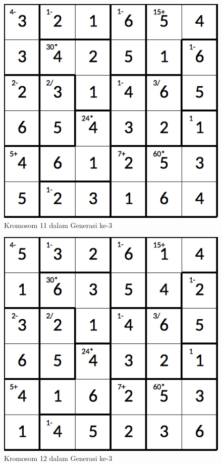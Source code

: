 \begin{figure}
\centering
\captionsetup{justification=centering}
\includegraphics[scale=0.333]{Gambar/hybridgenetic/Generation3Chromosome11}
\caption[Kromosom 11 dalam Generasi ke-3]{Kromosom 11 dalam Generasi ke-3}
\label{fig:analisisg3k11}
\end{figure}

\begin{figure}
\centering
\captionsetup{justification=centering}
\includegraphics[scale=0.333]{Gambar/hybridgenetic/Generation3Chromosome12}
\caption[Kromosom 12 dalam Generasi ke-3]{Kromosom 12 dalam Generasi ke-3}
\label{fig:analisisg3k12}
\end{figure}


